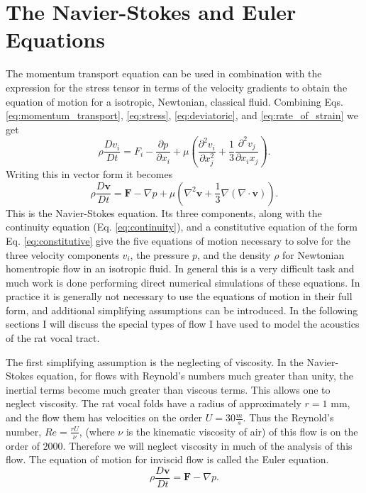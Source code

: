 \documentclass[12pt, letter]{report}
\begin{document}
\section{The Navier-Stokes and Euler Equations}
The momentum transport equation can be used in combination with the expression for the stress tensor in terms of the velocity gradients to obtain the equation of motion for a isotropic, Newtonian, classical fluid. Combining Eqs. \ref{eq:momentum_transport}, \ref{eq:stress}, \ref{eq:deviatoric}, and \ref{eq:rate_of_strain} we get
\begin{equation}   
\rho \frac{D v_i}{D t} = F_i - \frac{\partial p}{\partial x_i} + \mu \left( \frac{\partial^2 v_i}{\partial x_j^2} + \frac{1}{3} \frac{\partial^2 v_j}{\partial x_i x_j}\right).
\end{equation}
Writing this in vector form it becomes
\begin{equation}
\label{eq:navier} 
\rho \frac{D \textbf{v}}{D t} = \textbf{F} - \nabla p + \mu \left( \nabla^2 \textbf{v} + \frac{1}{3} \nabla (\nabla \cdot \textbf{v})\right).
\end{equation}
This is the Navier-Stokes equation. Its three components, along with the continuity equation (Eq. \ref{eq:continuity}), and a constitutive equation of the form Eq. \ref{eq:constitutive} give the five equations of motion necessary to solve for the three velocity components $v_i$, the pressure $p$, and the density $\rho$ for Newtonian homentropic flow in an isotropic fluid. In general this is a very difficult task and much work is done performing direct numerical simulations of these equations. In practice it is generally not necessary to use the equations of motion in their full form, and additional simplifying assumptions can be introduced. In the following sections I will discuss the special types of flow I have used to model the acoustics of the rat vocal tract.

The first simplifying assumption is the neglecting of viscosity. In the Navier-Stokes equation, for flows with Reynold's numbers much greater than unity, the inertial terms become much greater than viscous terms. This allows one to neglect viscosity. The rat vocal folds have a radius of approximately $r=1$ mm, and the flow them has velocities on the order $U=30 \frac{m}{s}$. Thus the Reynold's number, $Re=\frac{r U}{\nu}$, (where $\nu$ is the kinematic viscosity of air) of this flow is on the order of $2000$. Therefore we will neglect viscosity in much of the analysis of this flow. The equation of motion for inviscid flow is called the Euler equation.
\begin{equation}
\label{eq:euler} 
\rho \frac{D \textbf{v}}{D t} = \textbf{F} - \nabla p.
\end{equation} 
\end{document}
